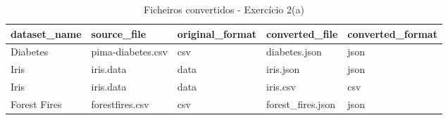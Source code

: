 \begin{table}[htbp]
\centering
\begin{tabular}{lllll}
\hline
dataset\_name & source\_file & original\_format & converted\_file & converted\_format \\
\hline
Diabetes & pima-diabetes.csv & csv & diabetes.json & json \\
Iris & iris.data & data & iris.json & json \\
Iris & iris.data & data & iris.csv & csv \\
Forest Fires & forestfires.csv & csv & forest\_fires.json & json \\
\hline
\end{tabular}
\caption{Ficheiros convertidos - Exercício 2(a)}
\label{tab:ex2a-converted-files}
\end{table}